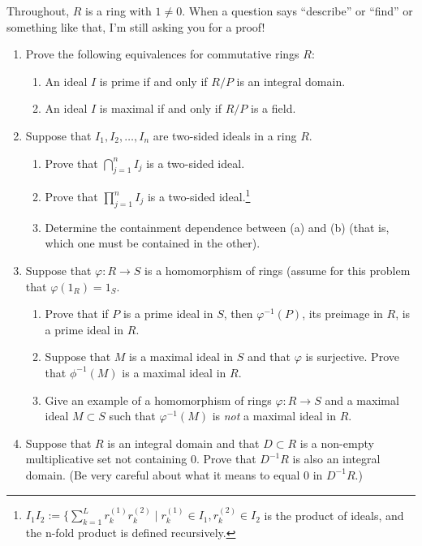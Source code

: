 \documentclass[12pt]{article}
\begin{document}
\pagestyle{fancy}

Throughout, $R$ is a ring with $1\neq 0$. When a question says
``describe'' or ``find'' or something like that, I'm still asking you
for a proof!
\begin{enumerate}
\item Prove the following equivalences for commutative rings $R$:
  \begin{enumerate}
  \item An ideal $I$ is prime if and only if $R/P$ is an integral
    domain.
  \item An ideal $I$ is maximal if and only if $R/P$ is a field.
  \end{enumerate}
\item Suppose that $I_1,I_2,\dotsc,I_n$ are two-sided ideals in a ring
  $R$. 
  \begin{enumerate}
  \item Prove that $\bigcap_{j=1}^n I_j$ is a two-sided ideal.
  \item Prove that $\prod\limits_{j=1}^n I_j$ is a two-sided
    ideal.\footnote{$I_1I_2:=\{\sum\limits_{k=1}^L r_k^{(1)}r_k^{(2)}
      \mid r_k^{(1)}\in I_1, r_k^{(2)}\in I_2$ is the product of
      ideals, and the n-fold product is defined recursively.}
  \item Determine the containment dependence between (a) and (b) (that
    is, which one must be contained in the other). 
  \end{enumerate}
\item Suppose that $\varphi: R\rightarrow S$ is a homomorphism of
  rings (assume for this problem that $\varphi(1_R)=1_S$. 
\begin{enumerate}
\item Prove that if $P$ is a prime ideal in $S$, then
  $\varphi^{-1}(P)$, its preimage in $R$, is a prime ideal in $R$. 
\item Suppose that $M$ is a maximal ideal in $S$ and that $\varphi$ is
  surjective. Prove that $\phi^{-1}(M)$ is a maximal ideal in $R$. 
\item Give an example of a homomorphism of rings $\varphi:
  R\rightarrow S$ and a maximal ideal $M\subset S$ such that
  $\varphi^{-1}(M)$ is \emph{not} a maximal ideal in $R$. 
\end{enumerate}
\item Suppose that $R$ is an integral domain and that $D\subset R$ is
  a non-empty multiplicative set not containing $0$. Prove that
  $D^{-1}R$ is also an integral domain. (Be very careful about what it
  means to equal $0$ in $D^{-1}R$.)

\end{enumerate}
\end{document}
